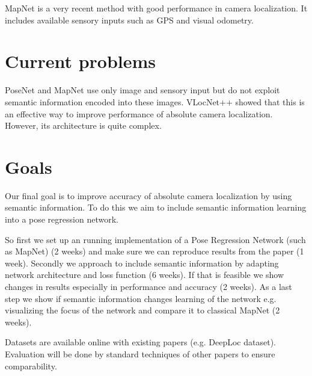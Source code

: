 \documentclass[11pt,twocolumn,letterpaper]{article}
\begin{document}
MapNet \cite{mapnet2018} is a very recent method with good performance in camera localization. It includes available sensory inputs such as GPS and visual odometry.

\section{Current problems}
PoseNet and MapNet use only image and sensory input but do not exploit semantic information encoded into these images. VLocNet++ showed that this is an effective way to improve performance of absolute camera localization. However, its architecture is quite complex. 

\section{Goals}

Our final goal is to improve accuracy of absolute camera localization by using semantic information. To do this we aim to include semantic information learning into a pose regression network.
 
So first we set up an running implementation of a Pose Regression Network (such as MapNet) (2 weeks) and make sure we can reproduce results from the paper (1 week). Secondly we approach to include semantic information by adapting network architecture and loss function (6 weeks). If that is feasible we show changes in results especially in performance and accuracy (2 weeks). As a last step we show if semantic information changes learning of the network e.g. visualizing the focus of the network and compare it to classical MapNet (2 weeks).

Datasets are available online with existing papers (e.g. DeepLoc dataset). Evaluation will be done by standard techniques of other papers to ensure comparability.




\printbibliography
\end{document}
